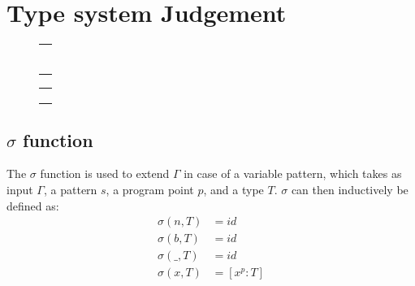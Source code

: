 \documentclass[../../master.tex]{subfiles}
\begin{document}
	
\section{Type system Judgement}\label{App:TypeSys}
\begin{figure}[H]
	\setlength\tabcolsep{8pt}
	\begin{tabular}{l}
		\\[1cm]
		\\[1cm]
		\\[1cm]
		\\[1cm]
		\\[1cm]
		\\[1cm]
		\\[1cm]
	\end{tabular}
	\label{fig:TypeSys1}
\end{figure}

\begin{figure}[H]
	\setlength\tabcolsep{8pt}
	\begin{tabular}{l}
		\\[1cm]
		\\[1cm]
		\\[1cm]
		\\[1cm]
		
	\end{tabular}
	\label{fig:TypeSys2}
\end{figure}

\subsection{$\sigma$ function}
The $\sigma$ function is used to extend $\Gamma$ in case of a variable pattern, which takes as input $\Gamma$, a pattern $s$, a program point $p$, and a type $T$.
$\sigma$ can then inductively be defined as:
\begin{align*}
	\sigma(n,T) &= id\\
	\sigma(b,T) &= id\\
	\sigma(\_,T) &= id\\
	\sigma(x,T) &= [x^p:T]
\end{align*}
\end{document}
